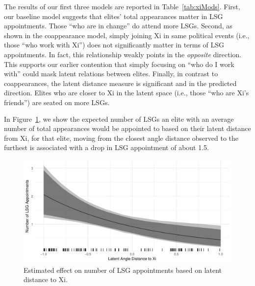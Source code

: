 \documentclass[11pt,english]{article}
\begin{document}
\begin{flushleft}
The results of our first three models are reported in Table~\ref{tab:xiMods}. First, our baseline model suggests that elites' total appearances matter in LSG appointments. Those ``who are in change'' do attend more LSGs. Second, as shown in the coappearance model, simply joining Xi in same political events (i.e., those ``who work with Xi'') does not significantly matter in terms of LSG appointments. In fact, this relationship weakly points in the \emph{opposite} direction. This supports our earlier contention that simply focusing on ``who do I work with'' could mask latent relations between elites. Finally, in contrast to coappearances, the latent distance measure is significant and in the predicted direction. Elites who are closer to Xi in the latent space (i.e., those ``who are Xi's friends'') are seated on more LSGs.

In Figure~\ref{fig:effects}, we show the expected number of LSGs an elite with an average number of total appearances would be appointed to based on their latent distance from Xi, for that elite, moving from the closest angle distance observed to the furthest is associated with a drop in LSG appointment of about 1.5.

\noindent \begin{center}
\begin{figure}[H]
\noindent \begin{centering}
\includegraphics[width=1\textwidth]{figure/effects}
\par\end{centering}
\caption{Estimated effect on number of LSG appointments based on latent distance to Xi.}
\label{fig:effects}
\end{figure}
\par\end{center}


\end{flushleft}
\end{document}
